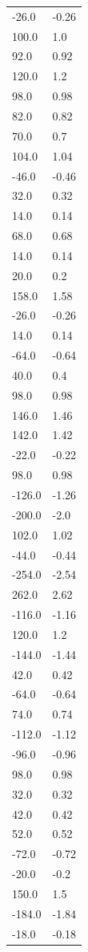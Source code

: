 \begin{longtable}{ll}
-26.0 & -0.26 \\
100.0 & 1.0 \\
92.0 & 0.92 \\
120.0 & 1.2 \\
98.0 & 0.98 \\
82.0 & 0.82 \\
70.0 & 0.7 \\
104.0 & 1.04 \\
-46.0 & -0.46 \\
32.0 & 0.32 \\
14.0 & 0.14 \\
68.0 & 0.68 \\
14.0 & 0.14 \\
20.0 & 0.2 \\
158.0 & 1.58 \\
-26.0 & -0.26 \\
14.0 & 0.14 \\
-64.0 & -0.64 \\
40.0 & 0.4 \\
98.0 & 0.98 \\
146.0 & 1.46 \\
142.0 & 1.42 \\
-22.0 & -0.22 \\
98.0 & 0.98 \\
-126.0 & -1.26 \\
-200.0 & -2.0 \\
102.0 & 1.02 \\
-44.0 & -0.44 \\
-254.0 & -2.54 \\
262.0 & 2.62 \\
-116.0 & -1.16 \\
120.0 & 1.2 \\
-144.0 & -1.44 \\
42.0 & 0.42 \\
-64.0 & -0.64 \\
74.0 & 0.74 \\
-112.0 & -1.12 \\
-96.0 & -0.96 \\
98.0 & 0.98 \\
32.0 & 0.32 \\
42.0 & 0.42 \\
52.0 & 0.52 \\
-72.0 & -0.72 \\
-20.0 & -0.2 \\
150.0 & 1.5 \\
-184.0 & -1.84 \\
-18.0 & -0.18 \\

\end{longtable}

